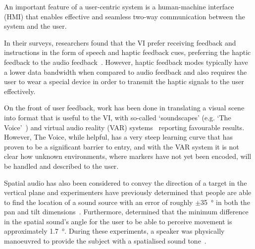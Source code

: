 \documentclass[format=sigconf, review=true, screen=true, anonymous=true]{acmart}
\begin{document}


An important feature of a user-centric system is a human-machine interface (HMI) that enables effective and seamless two-way communication between the system and the user. %

In their surveys, researchers found that the VI prefer receiving feedback and instructions in the form of speech and haptic feedback cues, preferring the haptic feedback to the audio feedback~\cite{khoo2016multimodal, ross2000wearable}. However, haptic feedback modes typically have a lower data bandwidth when compared to audio feedback and also requires the user to wear a special device in order to transmit the haptic signals to the user effectively. 

On the front of user feedback, work has been done in translating a visual scene into format that is useful to the VI, with so-called `soundscapes' (e.g. `The Voice'~\cite{meijer2010}) and virtual audio reality (VAR) systems~\cite{frauenberger2003} reporting favourable results. However, The Voice, while helpful, has a very steep learning curve that has proven to be a significant barrier to entry, and with the VAR system it is not clear how unknown environments, where markers have not yet been encoded, will be handled and described to the user. 

Spatial audio has also been considered to convey the direction of a target in the vertical plane and experimenters have previously determined that people are able to find the location of a sound source with an error of roughly $\pm$\SI{35}{\degree} in both the pan and tilt dimensions~\cite{zwiers2001spatial}. Furthermore, \citeauthor{ashmead1998spatial} determined that the minimum difference in the spatial sound's angle for the user to be able to perceive movement is approximately \SI{1.7}{\degree}. During these experiments, a speaker was physically manoeuvred to provide the subject with a spatialised sound tone~\cite{ashmead1998spatial}. 
\end{document}
